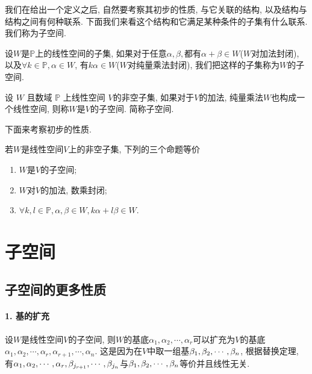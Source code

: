 \documentclass{ctexart}
\begin{document}
我们在给出一个定义之后, 自然要考察其初步的性质, 与它关联的结构, 以及结构与结构之间有何种联系. 下面我们来看这个结构和它满足某种条件的子集有什么联系. 我们称为子空间. 

设$W$是$\mathbb P$上的线性空间的子集, 如果对于任意$\alpha, \beta, $都有$\alpha+\beta \in W$($W$对加法封闭), 以及$\forall k \in \mathbb{P}, \alpha \in W$, 有$k {\alpha} \in W$($W$对纯量乘法封闭), 我们把这样的子集称为$W$的子空间. 

\begin{definition}
    设 $W$ 且数域 $\mathbb{P} $ 上线性空间 $V$的非空子集, 如果对于$V$的加法, 纯量乘法$W$也构成一个线性空间, 则称$W$是$V$的子空间. 简称子空间. 
\end{definition}

下面来考察初步的性质. 

\begin{prop}
    若$W$是线性空间$V$上的非空子集, 下列的三个命题等价
    \begin{enumerate}
        \item $W$是$V$的子空间;
        \item $W$对$V$的加法, 数乘封闭; 
        \item $\forall k, l \in \mathbb{P}, \alpha, \beta \in W,  k \alpha+l \beta \in W$.
    \end{enumerate}
\end{prop}





\section{子空间}

\subsection{子空间的更多性质}

\paragraph{1. 基的扩充} 设$W$是线性空间$V$的子空间, 则$W$的基底$\alpha_1, \alpha_2,\cdots, \alpha_r$可以扩充为$V$的基底$\alpha_1, \alpha_2,\cdots, \alpha_r,\alpha_{r+1},\cdots, \alpha_n$. 
这是因为在$V$中取一组基${{\beta}_1, {\beta}_2,\cdots, {\beta}_{n}}$, 根据替换定理, 有${{\alpha}_1, {\alpha}_2,\cdots, {\alpha}_{r}},\beta_{j_{r+1}},\cdots, \beta_{j_n}$与${{\beta}_1, {\beta}_2,\cdots, {\beta}_{n}}$等价并且线性无关. 
\end{document}
